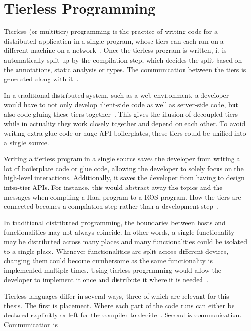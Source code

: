 \documentclass[a4paper]{book}
\begin{document}
\section{Tierless Programming}
\label{sec:tierless-programming}
Tierless (or multitier) programming is the practice of writing code for a
distributed application in a single program, whose tiers can each run on a
different machine on a network~\cite{weisenburger2020survey}. Once the tierless
program is written, it is automatically split up by the compilation step, which
decides the split based on the annotations, static analysis or types. The
communication between the tiers is generated along with
it~\cite{weisenburger2020survey}.
\par
In a traditional distributed system, such as a web environment, a developer
would have to not only develop client-side code as well as server-side code, but
also code gluing these tiers together~\cite{weisenburger2020survey}. This gives
the illusion of decoupled tiers while in actuality they work closely together
and depend on each other. To avoid writing extra glue code or huge API
boilerplates, these tiers could be unified into a single source.
\par
Writing a tierless program in a single source saves the developer from writing a
lot of boilerplate code or glue code, allowing the developer to solely focus on
the high-level interactions. Additionally, it saves the developer from having to
design inter-tier APIs. For instance, this would abstract away the topics and
the messages when compiling a Haai program to a ROS program.  How the tiers are
connected becomes a compilation step rather than a development
step~\cite{weisenburger2020survey}.
\par
In traditional distributed programming, the boundaries between hosts and
functionalities may not always coincide. In other words, a single functionality
may be distributed across many places and many functionalities could be isolated
to a single place. Whenever functionalities are split across different devices,
changing them could become cumbersome as the same functionality is implemented
multiple times. Using tierless programming would allow the developer to
implement it once and distribute it where it is
needed~\cite{weisenburger2020survey}.
\par
Tierless languages differ in several ways, three of which are relevant for this
thesis. The first is placement. Where each part of the code runs can either be
declared explicitly or left for the compiler to
decide~\cite{weisenburger2020survey}. Second is communication. Communication is
\end{document}
